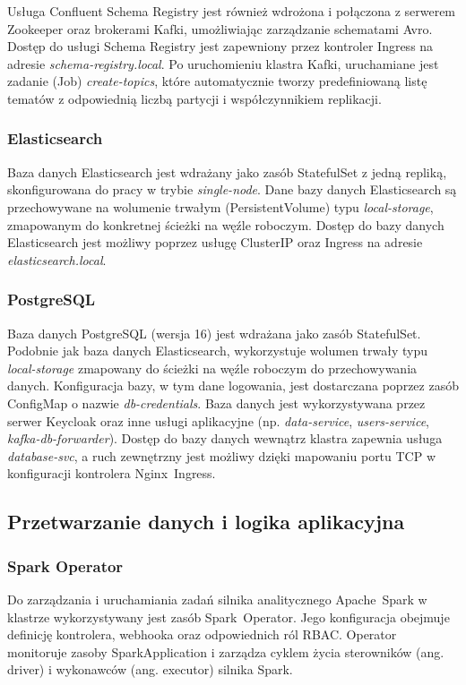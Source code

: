 Usługa Confluent Schema Registry jest również wdrożona i połączona z serwerem Zookeeper oraz brokerami Kafki, umożliwiając zarządzanie schematami Avro. Dostęp do usługi Schema Registry jest zapewniony przez kontroler Ingress na adresie \textit{schema-registry.local}. Po uruchomieniu klastra Kafki, uruchamiane jest zadanie (Job) \textit{create-topics}, które automatycznie tworzy predefiniowaną listę tematów z odpowiednią liczbą partycji i współczynnikiem replikacji.

\subsubsection{Elasticsearch}
Baza danych Elasticsearch jest wdrażany jako zasób StatefulSet z jedną repliką, skonfigurowana do pracy w trybie \textit{single-node}. Dane bazy danych Elasticsearch są przechowywane na wolumenie trwałym (PersistentVolume) typu \textit{local-storage}, zmapowanym do konkretnej ścieżki na węźle roboczym. Dostęp do bazy danych Elasticsearch jest możliwy poprzez usługę ClusterIP oraz Ingress na adresie \textit{elasticsearch.local}.

\subsubsection{PostgreSQL}
Baza danych PostgreSQL (wersja 16) jest wdrażana jako zasób StatefulSet. Podobnie jak baza danych Elasticsearch, wykorzystuje wolumen trwały typu \textit{local-storage} zmapowany do ścieżki na węźle roboczym do przechowywania danych. Konfiguracja bazy, w tym dane logowania, jest dostarczana poprzez zasób \mbox{ConfigMap} o nazwie \textit{db-credentials}. Baza danych jest wykorzystywana przez serwer Keycloak oraz inne usługi aplikacyjne (np. \textit{data-service}, \textit{users-service}, \textit{kafka-db-forwarder}). Dostęp do bazy danych wewnątrz klastra zapewnia usługa \textit{database-svc}, a ruch zewnętrzny jest możliwy dzięki mapowaniu portu TCP w konfiguracji kontrolera \mbox{Nginx Ingress}.

\subsection{Przetwarzanie danych i logika aplikacyjna}

\subsubsection{Spark Operator}
Do zarządzania i uruchamiania zadań silnika analitycznego \mbox{Apache Spark} w klastrze wykorzystywany jest zasób \mbox{Spark Operator}. Jego konfiguracja obejmuje definicję kontrolera, webhooka oraz odpowiednich ról RBAC. Operator monitoruje zasoby \mbox{SparkApplication} i zarządza cyklem życia sterowników (ang. driver) i wykonawców (ang. executor) silnika Spark.

